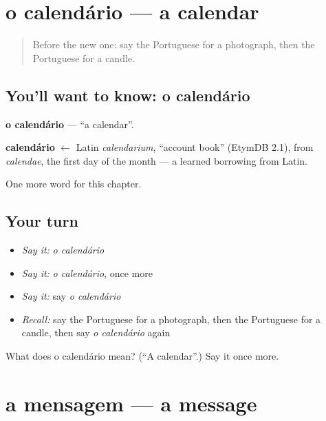 \section[o calendário]{o calendário — a calendar}

\label{lesson:PT-C101-calendario}



\begin{quote}
Before the new one: say the Portuguese for a photograph, then the Portuguese for a candle.
\end{quote}

\subsection*{You'll want to know: o calendário}
\textbf{o calendário} — \textquotedblleft{}a calendar\textquotedblright{}.

\begin{cousinweb}
\textbf{calendário} $\leftarrow$ Latin \emph{calendarium}, \textquotedblleft{}account book\textquotedblright{} (EtymDB 2.1), from \emph{calendae}, the first day of the month — a learned borrowing from Latin.
\end{cousinweb}

\begin{grammarlens}[title={What you've built}]
One more word for this chapter.
\end{grammarlens}

\subsection*{Your turn}
\begin{itemize}
\raggedright
  \item \emph{Say it:} \emph{o calendário}
  \item \emph{Say it:} \emph{o calendário}, once more
  \item \emph{Say it:} say \emph{o calendário}
  \item \emph{Recall:} say the Portuguese for a photograph, then the Portuguese for a candle, then say \emph{o calendário} again
\end{itemize}

\begin{tcolorbox}[breakable,colback=teal!4,colframe=teal!35!black,title={Before you move on}]
What does o calendário mean? (\textquotedblleft{}A calendar\textquotedblright{}.) Say it once more.
\end{tcolorbox}
\section[a mensagem]{a mensagem — a message}

